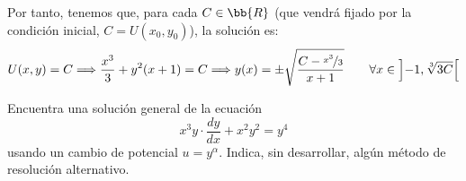 \documentclass[12pt]{article}
\begin{document}
\begin{ejercicio}
    Por tanto, tenemos que, para cada $C\in \bb{R}$ (que vendrá fijado por la condición inicial, $C=U(x_0,y_0)$), la solución es:
    \begin{equation*}
        U(x,y)=C
        \Longrightarrow
        \dfrac{x^3}{3}+y^2(x+1)=C
        \Longrightarrow
        y(x)=\pm\sqrt{\dfrac{C-\nicefrac{x^3}{3}}{x+1}}
        \qquad \forall x\in \left]-1,\sqrt[3]{3C}\right[
    \end{equation*}
\end{ejercicio}

\begin{ejercicio}
    Encuentra una solución general de la ecuación
    \begin{equation*}
        x^3y\cdot \dfrac{dy}{dx} + x^2y^2=y^4
    \end{equation*}
    usando un cambio de potencial $u=y^\alpha$. Indica, sin desarrollar, algún método de resolución alternativo.
\end{ejercicio}
\end{document}
